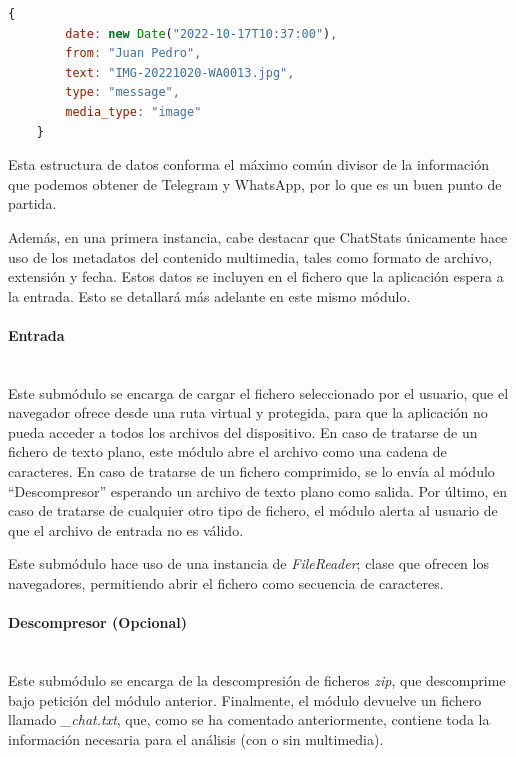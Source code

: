 \begin{lstlisting}[language=JavaScript]
	{
		date: new Date("2022-10-17T10:37:00"),
		from: "Juan Pedro",
		text: "IMG-20221020-WA0013.jpg",
		type: "message",
		media_type: "image"
	}
\end{lstlisting}

Esta estructura de datos conforma el máximo común divisor de la información que podemos obtener de Telegram y WhatsApp, por lo que es un buen punto de partida.

Además, en una primera instancia, cabe destacar que ChatStats únicamente hace uso de los metadatos del contenido multimedia, tales como formato de archivo, extensión y fecha. Estos datos se incluyen en el fichero que la aplicación espera a la entrada. Esto se detallará más adelante en este mismo módulo.


\paragraph{Entrada}\mbox{}\\

Este submódulo se encarga de cargar el fichero seleccionado por el usuario, que el navegador ofrece desde una ruta virtual y protegida, para que la aplicación no pueda acceder a todos los archivos del dispositivo. En caso de tratarse de un fichero de texto plano, este módulo abre el archivo como una cadena de caracteres. En caso de tratarse de un fichero comprimido, se lo envía al módulo ``Descompresor'' esperando un archivo de texto plano como salida. Por último, en caso de tratarse de cualquier otro tipo de fichero, el módulo alerta al usuario de que el archivo de entrada no es válido.

Este submódulo hace uso de una instancia de \textit{FileReader}; clase que ofrecen los navegadores, permitiendo abrir el fichero como secuencia de caracteres.

\paragraph{Descompresor (Opcional)}\mbox{}\\

Este submódulo se encarga de la descompresión de ficheros \textit{zip}, que descomprime bajo petición del módulo anterior. Finalmente, el módulo devuelve un fichero llamado \textit{\_chat.txt}, que, como se ha comentado anteriormente, contiene toda la información necesaria para el análisis (con o sin multimedia).

